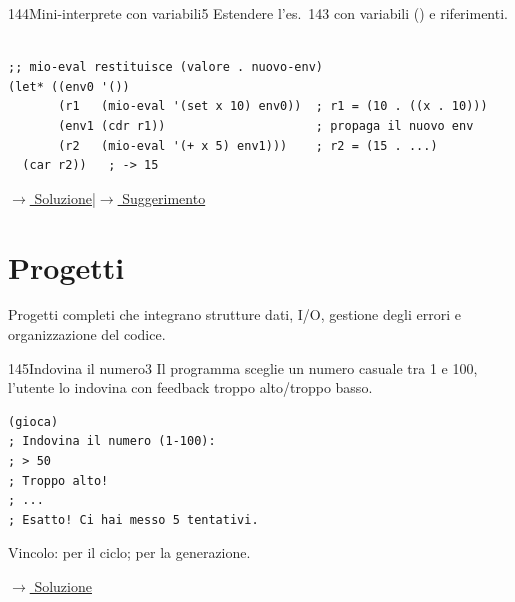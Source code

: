 \label{ex:144}
\begin{colbox}{144}{Mini-interprete con variabili}{5}
Estendere l'es.~143 con variabili () e riferimenti.\\\\
\begin{lstlisting}
;; mio-eval restituisce (valore . nuovo-env)
(let* ((env0 '())
       (r1   (mio-eval '(set x 10) env0))  ; r1 = (10 . ((x . 10)))
       (env1 (cdr r1))                     ; propaga il nuovo env
       (r2   (mio-eval '(+ x 5) env1)))    ; r2 = (15 . ...)
  (car r2))   ; -> 15
\end{lstlisting}

\small\color{black!55}\hyperref[sol:144]{$\rightarrow$ Soluzione}\enspace\textcolor{black!30}{|}\enspace\hyperref[hint:144]{$\rightarrow$ Suggerimento}\normalsize\color{black}
\end{colbox}

\setcounter{section}{9}
\section{Progetti}

\noindent
Progetti completi che integrano strutture dati, I/O, gestione
degli errori e organizzazione del codice.

\bigskip

\label{ex:145}
\begin{stdbox}{145}{Indovina il numero}{3}
Il programma sceglie un numero casuale tra 1 e 100,
l'utente lo indovina con feedback troppo alto/troppo basso.
\begin{lstlisting}
(gioca)
; Indovina il numero (1-100):
; > 50
; Troppo alto!
; ...
; Esatto! Ci hai messo 5 tentativi.
\end{lstlisting}
Vincolo:  per il ciclo;  per la generazione.


\small\color{black!55}\hyperref[sol:145]{$\rightarrow$ Soluzione}\normalsize\color{black}
\end{stdbox}

